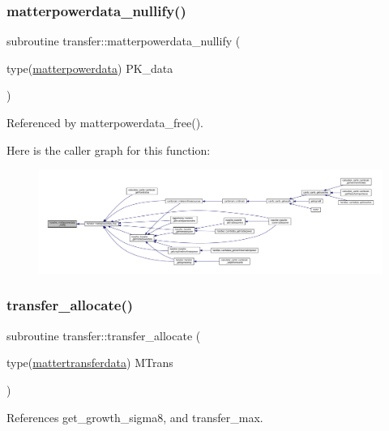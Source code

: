 \subsubsection{\texorpdfstring{matterpowerdata\+\_\+nullify()}{matterpowerdata\_nullify()}}
{\footnotesize\ttfamily subroutine transfer\+::matterpowerdata\+\_\+nullify (\begin{DoxyParamCaption}\item[{type(\mbox{\hyperlink{structtransfer_1_1matterpowerdata}{matterpowerdata}})}]{P\+K\+\_\+data }\end{DoxyParamCaption})}



Referenced by matterpowerdata\+\_\+free().

Here is the caller graph for this function\+:
\nopagebreak
\begin{figure}[H]
\begin{center}
\leavevmode
\includegraphics[width=350pt]{namespacetransfer_a890cb72b18bbeb6b973f55ac477250e2_icgraph}
\end{center}
\end{figure}
\mbox{\label{namespacetransfer_a687f977819e9abe471f86cff900939e7}} 
\subsubsection{\texorpdfstring{transfer\+\_\+allocate()}{transfer\_allocate()}}
{\footnotesize\ttfamily subroutine transfer\+::transfer\+\_\+allocate (\begin{DoxyParamCaption}\item[{type(\mbox{\hyperlink{structtransfer_1_1mattertransferdata}{mattertransferdata}})}]{M\+Trans }\end{DoxyParamCaption})}



References get\+\_\+growth\+\_\+sigma8, and transfer\+\_\+max.



